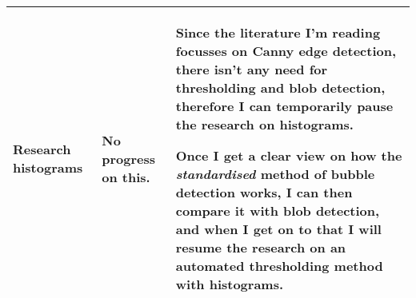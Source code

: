 \begin{table}[!h]
\begin{tabularx}{\textwidth}{|X|X|X|}
        \hline
        \begin{myitemize}
            \item Research histograms
        \end{myitemize} & 
        \begin{myitemize}
            \item No progress on this.
        \end{myitemize} & 
        \begin{myitemize}
            \item Since the literature I'm reading focusses on Canny edge detection, there isn't any need for thresholding and blob detection, therefore I can temporarily pause the research on histograms.
            \item Once I get a clear view on how the \textit{standardised} method of bubble detection works, I can then compare it with blob detection, and when I get on to that I will resume the research on an automated thresholding method with histograms.
        \end{myitemize} \\
        \hline
    \end{tabularx}
\end{table}

